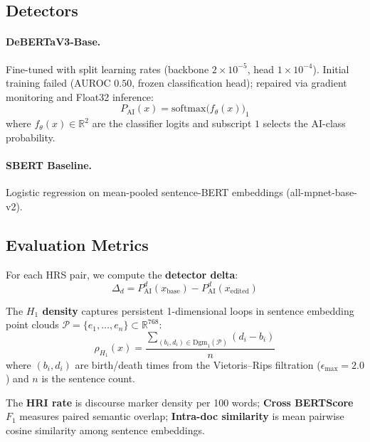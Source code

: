 \documentclass[11pt]{article}
\begin{document}
\subsection{Detectors}

\paragraph{DeBERTaV3-Base.} Fine-tuned with split learning rates (backbone $2{\times}10^{-5}$, head $1{\times}10^{-4}$). Initial training failed (AUROC $0.50$, frozen classification head); repaired via gradient monitoring and Float32 inference:
\begin{equation}
    P_{\text{AI}}(x) = \text{softmax}\!\big(f_\theta(x)\big)_1
\end{equation}
where $f_\theta(x) \in \mathbb{R}^2$ are the classifier logits and subscript $1$ selects the AI-class probability.

\paragraph{SBERT Baseline.} Logistic regression on mean-pooled sentence-BERT embeddings (all-mpnet-base-v2).

\subsection{Evaluation Metrics}

For each HRS pair, we compute the \textbf{detector delta}:
\begin{equation}
    \Delta_d = P_{\text{AI}}^d(x_{\text{base}}) - P_{\text{AI}}^d(x_{\text{edited}})
\end{equation}

The \textbf{$H_1$ density} captures persistent 1-dimensional loops in sentence embedding point clouds $\mathcal{P} = \{e_1, \ldots, e_n\} \subset \mathbb{R}^{768}$:
\begin{equation}
    \rho_{H_1}(x) = \frac{\sum_{(b_i, d_i) \in \text{Dgm}_1(\mathcal{P})} (d_i - b_i)}{n}
\end{equation}
where $(b_i, d_i)$ are birth/death times from the Vietoris--Rips filtration ($\epsilon_{\max} = 2.0$) and $n$ is the sentence count.

The \textbf{HRI rate} is discourse marker density per 100 words; \textbf{Cross BERTScore} $F_1$ measures paired semantic overlap; \textbf{Intra-doc similarity} is mean pairwise cosine similarity among sentence embeddings.
\end{document}
